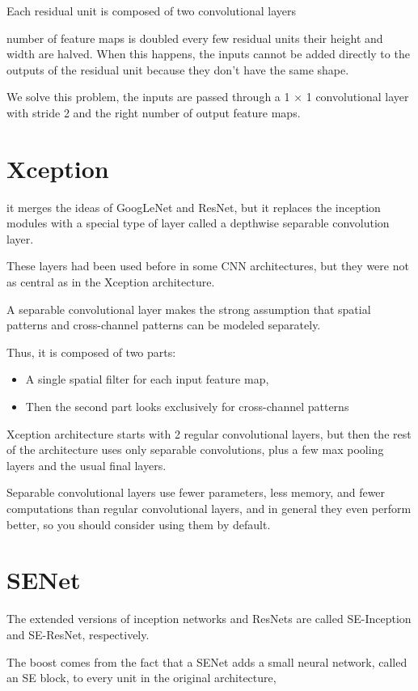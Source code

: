 \documentclass[11pt]{article}
\begin{document}
Each residual unit is composed of two convolutional layers

number of feature maps is doubled every few residual units
their height and width are halved. 
When this happens, the inputs cannot be added directly to the outputs of the
residual unit because they don't have the same shape. 

We solve this problem, 
the inputs are passed through a 1 × 1 convolutional layer
with stride 2 and the right number of output feature maps.
\section{Xception}
\label{sec:org7033066}
it merges the ideas of GoogLeNet and ResNet, 
but it replaces the inception modules with a special type of layer called a
depthwise separable convolution layer. 

These layers had been used before in some CNN architectures,
but they were not as central as in the Xception architecture. 

A separable convolutional layer makes the strong assumption that spatial
patterns and cross-channel patterns can be modeled separately. 

Thus, it is composed of two parts:
\begin{itemize}
\item A single spatial filter for each input feature map,
\item Then the second part looks exclusively for cross-channel patterns
\end{itemize}

Xception architecture starts with 2 regular convolutional layers, 
but then the rest of the architecture uses only separable convolutions,
plus a few max pooling layers and the usual final layers.

Separable convolutional layers use fewer parameters, less memory, and fewer
computations than regular convolutional layers, and in general they even perform
better, so you should consider using them by default.

\section{SENet}
\label{sec:orgb444a99}
The extended versions of inception
networks and ResNets are called SE-Inception and SE-ResNet,
respectively. 

The boost comes from the fact that a SENet adds a small
neural network, called an SE block, to every unit in the original
architecture, 
\end{document}
